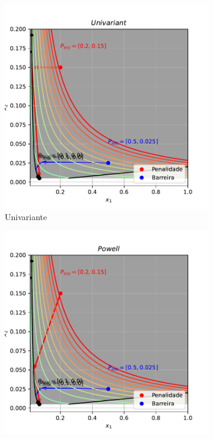 \documentclass[10pt, a4paper]{article}
\begin{document}
\begin{figure}[htpb]
  \centering
  \begin{subfigure}[b]{0.32\textwidth}
      \centering
      \includegraphics[width=\textwidth]{images/q4_Univariant.pdf}
      \caption{Univariante}
      \label{fig:q4_univariant}
  \end{subfigure}
  \hfill
  \begin{subfigure}[b]{0.32\textwidth}
    \centering
    \includegraphics[width=\textwidth]{images/q4_Powell.pdf}

\end{subfigure}
\end{figure}
\end{document}
